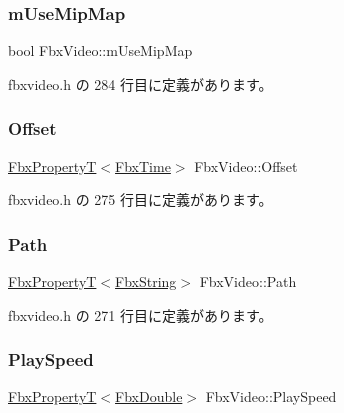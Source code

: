 \mbox{\label{class_fbx_video_a2c100f8b0f670f8490d91c71ac6b539e}} 
\subsubsection{\texorpdfstring{m\+Use\+Mip\+Map}{mUseMipMap}}
{\footnotesize\ttfamily bool Fbx\+Video\+::m\+Use\+Mip\+Map\hspace{0.3cm}{\ttfamily [protected]}}



 fbxvideo.\+h の 284 行目に定義があります。

\mbox{\label{class_fbx_video_ac21a47d9f4ec91abf585b2bcf8e0a3aa}} 
\subsubsection{\texorpdfstring{Offset}{Offset}}
{\footnotesize\ttfamily \hyperlink{class_fbx_property_t}{Fbx\+PropertyT}$<$\hyperlink{class_fbx_time}{Fbx\+Time}$>$ Fbx\+Video\+::\+Offset}



 fbxvideo.\+h の 275 行目に定義があります。

\mbox{\label{class_fbx_video_a3741896f51e9702d4c8b9d0e7065264c}} 
\subsubsection{\texorpdfstring{Path}{Path}}
{\footnotesize\ttfamily \hyperlink{class_fbx_property_t}{Fbx\+PropertyT}$<$\hyperlink{class_fbx_string}{Fbx\+String}$>$ Fbx\+Video\+::\+Path}



 fbxvideo.\+h の 271 行目に定義があります。

\mbox{\label{class_fbx_video_a43c6cf4ab4d46dd1a962258f5e4c42f2}} 
\subsubsection{\texorpdfstring{Play\+Speed}{PlaySpeed}}
{\footnotesize\ttfamily \hyperlink{class_fbx_property_t}{Fbx\+PropertyT}$<$\hyperlink{fbxtypes_8h_a171e72a1c46fc15c1a6c9c31948c1c5b}{Fbx\+Double}$>$ Fbx\+Video\+::\+Play\+Speed}



